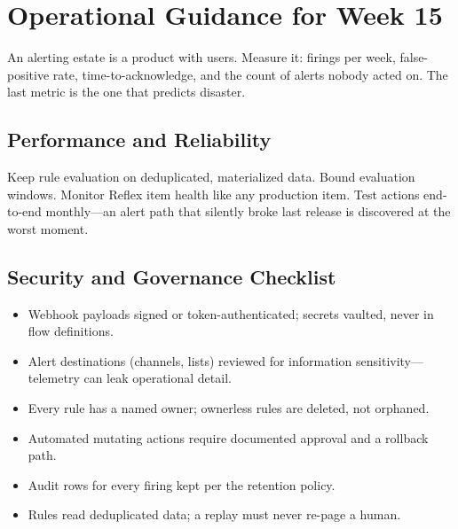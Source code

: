 \section{Operational Guidance for Week 15}
An alerting estate is a product with users. Measure it: firings per week, false-positive rate, time-to-acknowledge, and the count of alerts nobody acted on. The last metric is the one that predicts disaster.

\subsection{Performance and Reliability}
Keep rule evaluation on deduplicated, materialized data. Bound evaluation windows. Monitor Reflex item health like any production item. Test actions end-to-end monthly---an alert path that silently broke last release is discovered at the worst moment.

\subsection{Security and Governance Checklist}
\begin{itemize}
    \item Webhook payloads signed or token-authenticated; secrets vaulted, never in flow definitions.
    \item Alert destinations (channels, lists) reviewed for information sensitivity---telemetry can leak operational detail.
    \item Every rule has a named owner; ownerless rules are deleted, not orphaned.
    \item Automated mutating actions require documented approval and a rollback path.
    \item Audit rows for every firing kept per the retention policy.
    \item Rules read deduplicated data; a replay must never re-page a human.
\end{itemize}

